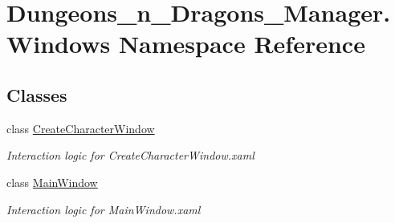 \hypertarget{namespace_dungeons__n___dragons___manager_1_1_windows}{}\section{Dungeons\+\_\+n\+\_\+\+Dragons\+\_\+\+Manager.\+Windows Namespace Reference}
\label{namespace_dungeons__n___dragons___manager_1_1_windows}
\subsection*{Classes}
\begin{DoxyCompactItemize}
\item 
class \mbox{\hyperlink{class_dungeons__n___dragons___manager_1_1_windows_1_1_create_character_window}{Create\+Character\+Window}}
\begin{DoxyCompactList}\small\item\em Interaction logic for Create\+Character\+Window.\+xaml \end{DoxyCompactList}\item 
class \mbox{\hyperlink{class_dungeons__n___dragons___manager_1_1_windows_1_1_main_window}{Main\+Window}}
\begin{DoxyCompactList}\small\item\em Interaction logic for Main\+Window.\+xaml \end{DoxyCompactList}\end{DoxyCompactItemize}
